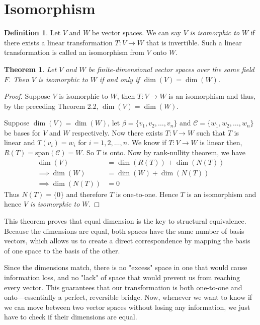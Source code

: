 \documentclass[12pt, a4paper]{article}
\newtheorem{theorem}{Theorem}[section]
\theoremstyle{definition}
\newtheorem{definition}{Definition}[section]
\theoremstyle{remark}
\begin{document}
\section{Isomorphism}
\begin{definition}
    Let $V$ and $W$ be vector spaces. We can say $V$ \textit{is isomorphic to} $W$ if there exists a linear transformation $T:V\to W$ that is invertible. Such a linear transformation is called an isomorphism from $V$ onto $W$.
\end{definition}

\begin{theorem}
    Let $V$ and $W$ be finite-dimensional vector spaces over the same field $F$. Then $V$ \textit{is isomorphic to} $W$ if and only if $\dim(V) = \dim(W)$.
\end{theorem}

\begin{proof}
    Suppose $V$ is isomorphic to $W$, then $T: V \to W$ is an isomorphism and thus, by the preceding Theorem 2.2, $\dim(V) = \dim(W)$.

    Suppose $\dim(V) = \dim(W)$, let $\beta = \{v_1, v_2, \dots, v_n\}$ and $\mathcal{C} = \{w_1, w_2, \dots, w_n\}$ be bases for $V$ and $W$ respectively. Now there exists $T: V \to W$ such that $T$ is linear and $T(v_i) = w_i$ for $i = 1, 2, \dots, n$. We know if $T:V \to W$ is linear then, $R(T) = \text{span}(\mathcal{C}) = W$. So $T$ is onto. Now by rank-nullity theorem, we have
    \begin{align*}
        \dim(V) &= \dim(R(T)) + \dim(N(T)) \\
        \implies \dim(W) &= \dim(W) + \dim(N(T)) \\
        \implies \dim(N(T)) &= 0
    \end{align*}
    Thus $N(T) = \{0\} $ and therefore $T$ is one-to-one. Hence $T$ is an isomorphism and hence $V$ \textit{is isomorphic to} $W$.
\end{proof}

This theorem proves that equal dimension is the key to structural equivalence. Because the dimensions are equal, both spaces have the same number of basis vectors, which allows us to create a direct correspondence by mapping the basis of one space to the basis of the other.

Since the dimensions match, there is no "excess" space in one that would cause information loss, and no "lack" of space that would prevent us from reaching every vector. This guarantees that our transformation is both one-to-one and onto—essentially a perfect, reversible bridge. Now, whenever we want to know if we can move between two vector spaces without losing any information, we just have to check if their dimensions are equal.
\end{document}

